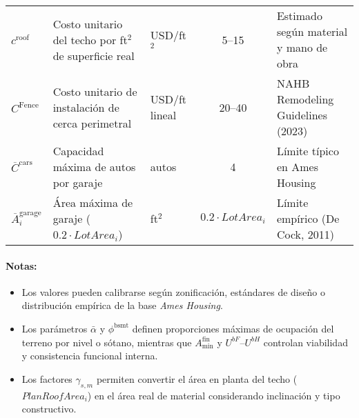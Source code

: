 \begin{table}[H]
\begin{tabular}{lllcl}
$c^{\text{roof}}$ & Costo unitario del techo por ft$^2$ de superficie real &
USD/ft$^2$ & 5–15 &
Estimado según material y mano de obra \\

$C^{\text{Fence}}$ & Costo unitario de instalación de cerca perimetral &
USD/ft lineal & 20–40 &
NAHB Remodeling Guidelines (2023) \\

$\overline{C}^{\text{cars}}$ & Capacidad máxima de autos por garaje &
autos & 4 &
Límite típico en Ames Housing \\

$\overline{A}^{\text{garage}}_i$ & Área máxima de garaje ($0.2\cdot LotArea_i$) &
ft$^2$ & $0.2\cdot LotArea_i$ &
Límite empírico (De Cock, 2011) \\
\bottomrule
\end{tabular}
\end{table}

\paragraph{Notas:}
\begin{itemize}
    \item Los valores pueden calibrarse según zonificación, estándares de diseño o distribución empírica de la base \textit{Ames Housing}.
    \item Los parámetros $\bar\alpha$ y $\phi^{\text{bsmt}}$ definen proporciones máximas de ocupación del terreno por nivel o sótano, mientras que $A_{\min}^{\text{fin}}$ y $U^{bF}$–$U^{bH}$ controlan viabilidad y consistencia funcional interna.
    \item Los factores $\gamma_{s,m}$ permiten convertir el área en planta del techo ($PlanRoofArea_i$) en el área real de material considerando inclinación y tipo constructivo.
\end{itemize}

